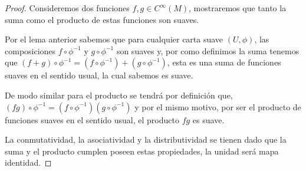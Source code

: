 \begin{proof}
  Consideremos dos funciones $f,g \in C^{\infty}(M)$, mostraremos que tanto la suma como el producto de estas funciones son suaves.

  Por el lema anterior sabemos que para cualquier carta suave $(U,\phi)$, las composiciones $f \circ \phi^{-1}$ y $g \circ \phi^{-1}$ son suaves y, por como definimos la suma tenemos que $(f + g)\circ \phi^{-1} = (f \circ \phi^{-1}) + (g \circ \phi^{-1})$, esta es una suma de funciones suaves en el sentido usual, la cual sabemos es suave.

  De modo similar para el producto se tendrá por definición que, $(fg)\circ\phi^{-1} = (f \circ \phi^{-1}) (g \circ \phi^{-1})$ y por el mismo motivo, por ser el producto de funciones suaves en el sentido usual, el producto $fg$ es suave.

  La conmutatividad, la asociatividad y la distributividad se tienen dado que la suma y el producto cumplen poseen estas propiedades, la unidad será mapa identidad.
\end{proof}
